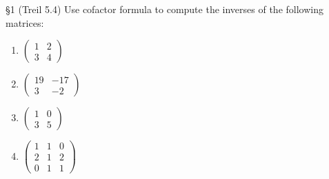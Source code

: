 \documentclass{review-sheet}
\begin{document}
\begin{problem}{\S 1}
  (Treil 5.4) Use cofactor formula to compute the inverses of the following matrices:
  \begin{enumerate}[label=(\alph*)]
    \item $\begin{pmatrix} 1&2\\3&4 \end{pmatrix} $
    \item $\begin{pmatrix} 19&-17\\3&-2 \end{pmatrix} $
    \item $\begin{pmatrix} 1&0\\3&5 \end{pmatrix} $
    \item $\begin{pmatrix} 1&1&0\\2&1&2\\0&1&1 \end{pmatrix} $
  \end{enumerate}
\end{problem}
\end{document}

